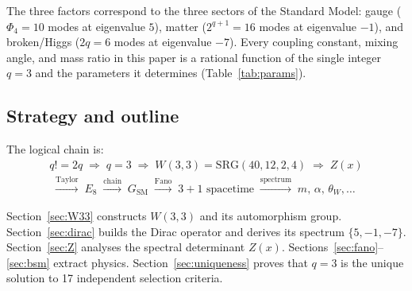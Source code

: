 \documentclass[12pt,a4paper]{article}
\theoremstyle{definition}
\newcommand{\SRG}{\mathrm{SRG}}
\begin{document}
\noindent
The three factors correspond to the three sectors of the Standard Model:
gauge ($\Phi_4=10$ modes at eigenvalue $5$), matter ($2^{q+1}=16$ modes
at eigenvalue $-1$), and broken/Higgs ($2q=6$ modes at eigenvalue $-7$).
Every coupling constant, mixing angle, and mass ratio in this paper
is a rational function of the single integer $q=3$ and the parameters
it determines (Table~\ref{tab:params}).

\subsection{Strategy and outline}

The logical chain is:
\begin{multline}
  \label{eq:chain}
  q!=2q \;\Longrightarrow\; q=3
  \;\Longrightarrow\; W(3,3) = \SRG(40,12,2,4)
  \;\Longrightarrow\; Z(x)\\
  \;\xrightarrow{\text{Taylor}}\; E_8
  \;\xrightarrow{\text{chain}}\; G_{\mathrm{SM}}
  \;\xrightarrow{\text{Fano}}\; 3{+}1\text{ spacetime}
  \;\xrightarrow{\text{spectrum}}\; m,\,\alpha,\,\theta_W,\ldots
\end{multline}

Section~\ref{sec:W33} constructs $W(3,3)$ and its automorphism group.
Section~\ref{sec:dirac} builds the Dirac operator and derives
its spectrum $\{5,-1,-7\}$.  Section~\ref{sec:Z} analyses the
spectral determinant $Z(x)$.  Sections~\ref{sec:fano}--\ref{sec:bsm}
extract physics.  Section~\ref{sec:uniqueness} proves that $q=3$ is
the unique solution to 17 independent selection criteria.
\end{document}
